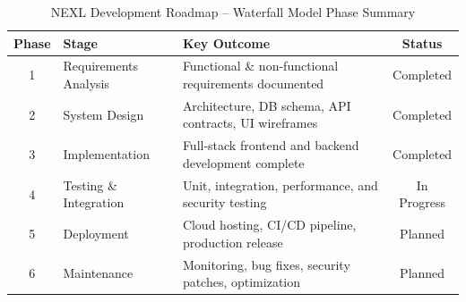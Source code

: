 \begin{table}[H]
\centering
\renewcommand{\arraystretch}{1.4}
\begin{tabular}{|c|l|l|c|}
\hline
\textbf{Phase} & \textbf{Stage} & \textbf{Key Outcome} & \textbf{Status} \\
\hline
1 & Requirements Analysis  & Functional \& non-functional requirements documented    & Completed   \\
2 & System Design          & Architecture, DB schema, API contracts, UI wireframes   & Completed   \\
3 & Implementation         & Full-stack frontend and backend development complete     & Completed   \\
4 & Testing \& Integration & Unit, integration, performance, and security testing     & In Progress \\
5 & Deployment             & Cloud hosting, CI/CD pipeline, production release        & Planned     \\
6 & Maintenance            & Monitoring, bug fixes, security patches, optimization    & Planned     \\
\hline
\end{tabular}
\caption{NEXL Development Roadmap -- Waterfall Model Phase Summary}
\label{tab:waterfall-phases}
\end{table}
